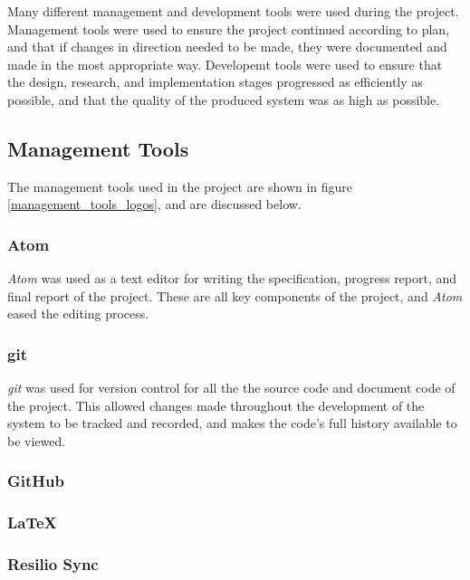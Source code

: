 
Many different management and development tools were used during the project. Management tools were used to ensure the project continued according to plan, and that if changes in direction needed to be made, they were documented and made in the most appropriate way. Developemt tools were used to ensure that the design, research, and implementation stages progressed as efficiently as possible, and that the quality of the produced system was as high as possible.

\subsection{Management Tools}
The management tools used in the project are shown in figure \ref{management_tools_logos}, and are discussed below.

\subsubsection{Atom \cite{atom}}
\textit{Atom} was used as a text editor for writing the specification, progress report, and final report of the project. These are all key components of the project, and \textit{Atom} eased the editing process.

\subsubsection{git \cite{git}}
\textit{git} was used for version control for all the the source code and document code of the project. This allowed changes made throughout the development of the system to be tracked and recorded, and makes the code's full history available to be viewed.

\subsubsection{GitHub \cite{github}}
\textit{}

\subsubsection{LaTeX \cite{latex}}
\subsubsection{Resilio Sync \cite{resilio_sync}}
